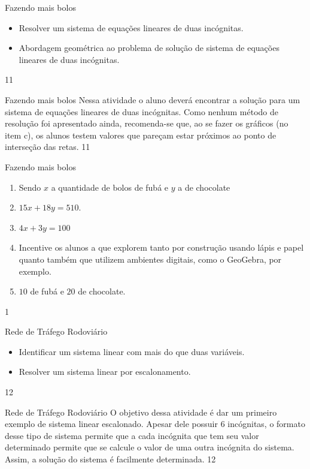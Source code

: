 \clearpage
\def\currentcolor{session1}
\begin{objectives}{Fazendo mais bolos}
{
\begin{itemize}
\item Resolver um sistema de equações lineares de duas incógnitas.
\item Abordagem geométrica ao problema de solução de sistema de equações lineares de duas incógnitas. 
\end{itemize}
}{1}{1}
\end{objectives}
\begin{sugestions}{Fazendo mais bolos}
{
Nessa atividade o aluno deverá encontrar a solução para um sistema de equações lineares de duas incógnitas. Como nenhum método de resolução foi apresentado ainda, recomenda-se que, ao se fazer os gráficos (no item c), os alunos testem valores que pareçam estar próximos ao ponto de interseção das retas.
}{1}{1}
\end{sugestions}
\begin{answer}{Fazendo mais bolos}
{
\begin{enumerate}
\item Sendo $x$ a quantidade de bolos de fubá e $y$ a de chocolate
\item $15x+18y =510$.
\item $4x+3y=100$
\item Incentive os alunos a que explorem tanto por construção usando lápis e papel quanto também que utilizem ambientes digitais, como o GeoGebra, por exemplo.
\item $10$ de fubá e $20$ de chocolate.
\end{enumerate}
}{1}
\end{answer}
\clearmargin
\begin{objectives}{Rede de Tráfego Rodoviário}
{
\begin{itemize}
\item Identificar um sistema linear com mais do que duas variáveis.
\item Resolver um sistema linear por escalonamento.
\end{itemize}
}{1}{2}
\end{objectives}
\begin{sugestions}{Rede de Tráfego Rodoviário}
{
O objetivo dessa atividade é dar um primeiro exemplo de sistema linear escalonado. Apesar dele possuir 6 incógnitas, o formato desse tipo de sistema permite que a cada incógnita que tem seu valor determinado permite que se calcule o valor de uma outra incógnita do sistema. Assim, a solução do sistema é facilmente determinada.
}{1}{2}
\end{sugestions}
